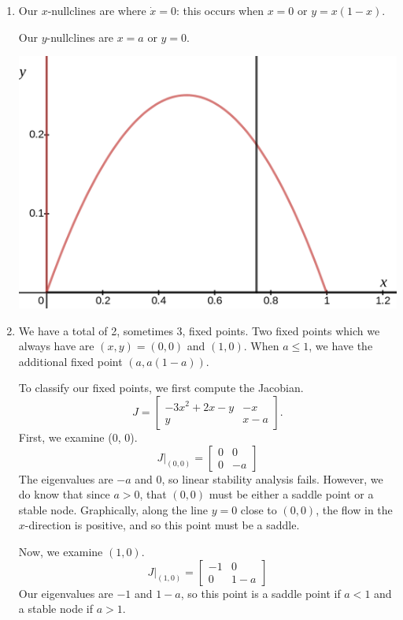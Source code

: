 \documentclass[10pt,letterpaper]{report}
\newcommand{\mtx}[2]{\left[\begin{array}{#1}#2\end{array}\right]}
\begin{document}
\begin{enumerate}
    \begin{enumerate}
    \item
    Our $x$-nullclines are where $\dot x = 0$: this occurs when $x = 0$ or $y = x(1-x)$.
    
    Our $y$-nullclines are $x = a$ or $y = 0.$
    
    \begin{center}
    \includegraphics[height=0.3\textwidth]{img/2019S2-1.png}
    \end{center}
    
    \item We have a total of 2, sometimes 3, fixed points. Two fixed points which we always have are $(x, y) = (0, 0)$ and $(1, 0)$. When $a \leq 1$, we have the additional fixed point $(a, a(1 - a))$.
    
    To classify our fixed points, we first compute the Jacobian.
    \[
    J = \mtx{cc}{-3x^2 + 2x - y & -x \\ y & x - a}.
    \]
    First, we examine (0, 0).
    \[
    J\big\vert_{(0, 0)} = \mtx{cr}{0 & 0 \\ 0 & -a}
    \]
    The eigenvalues are $-a$ and $0$, so linear stability analysis fails. However, we do know that since $a > 0$, that $(0, 0)$ must be either a saddle point or a stable node. Graphically, along the line $y = 0$ close to $(0, 0)$, the flow in the $x$-direction is positive, and so this point must be a saddle.
    
    Now, we examine $(1, 0)$.
    \[
    J\big\vert_{(1, 0)} = \mtx{rc}{-1 & 0 \\ 0 & 1 - a}
    \]
    Our eigenvalues are $-1$ and $1 - a$, so this point is a saddle point if $a < 1$ and a stable node if $a > 1.$
    

\end{enumerate}
\end{enumerate}
\end{document}
